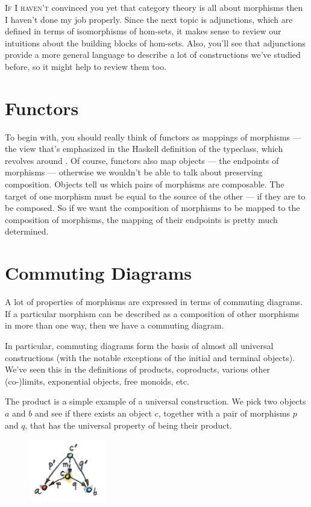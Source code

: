 
\lettrine[lhang=0.17]{I}{f I haven't} convinced you yet that category theory is all about
morphisms then I haven't done my job properly. Since the next topic is
adjunctions, which are defined in terms of isomorphisms of hom-sets, it
makes sense to review our intuitions about the building blocks of
hom-sets. Also, you'll see that adjunctions provide a more general
language to describe a lot of constructions we've studied before, so it
might help to review them too.

\section{Functors}

To begin with, you should really think of functors as mappings of
morphisms --- the view that's emphasized in the Haskell definition of
the  typeclass, which revolves around . Of
course, functors also map objects --- the endpoints of morphisms ---
otherwise we wouldn't be able to talk about preserving composition.
Objects tell us which pairs of morphisms are composable. The target of
one morphism must be equal to the source of the other --- if they are to
be composed. So if we want the composition of morphisms to be mapped to
the composition of  morphisms, the mapping of their
endpoints is pretty much determined.

\section{Commuting Diagrams}

A lot of properties of morphisms are expressed in terms of commuting
diagrams. If a particular morphism can be described as a composition of
other morphisms in more than one way, then we have a commuting diagram.

In particular, commuting diagrams form the basis of almost all universal
constructions (with the notable exceptions of the initial and terminal
objects). We've seen this in the definitions of products, coproducts,
various other (co-)limits, exponential objects, free monoids, etc.

The product is a simple example of a universal construction. We pick two
objects $a$ and $b$ and see if there exists an object
$c$, together with a pair of morphisms $p$ and $q$,
that has the universal property of being their product.

\begin{figure}[H]
  \centering
  \includegraphics[width=0.3\textwidth]{images/productranking.jpg}
\end{figure}

